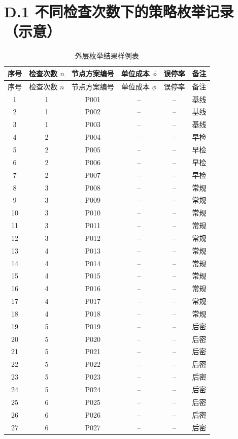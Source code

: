 \section*{D.1 不同检查次数下的策略枚举记录（示意）}
\small
\begin{longtable}{cccccc}
\caption{外层枚举结果样例表}\\
\toprule
序号 & 检查次数 $n$ & 节点方案编号 & 单位成本 $\phi$ & 误停率 & 备注\\
\midrule
\endfirsthead
\toprule
序号 & 检查次数 $n$ & 节点方案编号 & 单位成本 $\phi$ & 误停率 & 备注\\
\midrule
\endhead
1 & 1 & P001 &  --  & -- & 基线\\
2 & 1 & P002 &  --  & -- & 基线\\
3 & 1 & P003 &  --  & -- & 基线\\
4 & 2 & P004 &  --  & -- & 早检\\
5 & 2 & P005 &  --  & -- & 早检\\
6 & 2 & P006 &  --  & -- & 早检\\
7 & 2 & P007 &  --  & -- & 早检\\
8 & 3 & P008 &  --  & -- & 常规\\
9 & 3 & P009 &  --  & -- & 常规\\
10 & 3 & P010 & --  & -- & 常规\\
11 & 3 & P011 & --  & -- & 常规\\
12 & 3 & P012 & --  & -- & 常规\\
13 & 4 & P013 & --  & -- & 常规\\
14 & 4 & P014 & --  & -- & 常规\\
15 & 4 & P015 & --  & -- & 常规\\
16 & 4 & P016 & --  & -- & 常规\\
17 & 4 & P017 & --  & -- & 常规\\
18 & 4 & P018 & --  & -- & 常规\\
19 & 5 & P019 & --  & -- & 后密\\
20 & 5 & P020 & --  & -- & 后密\\
21 & 5 & P021 & --  & -- & 后密\\
22 & 5 & P022 & --  & -- & 后密\\
23 & 5 & P023 & --  & -- & 后密\\
24 & 5 & P024 & --  & -- & 后密\\
25 & 6 & P025 & --  & -- & 后密\\
26 & 6 & P026 & --  & -- & 后密\\
27 & 6 & P027 & --  & -- & 后密\\

\end{longtable}
